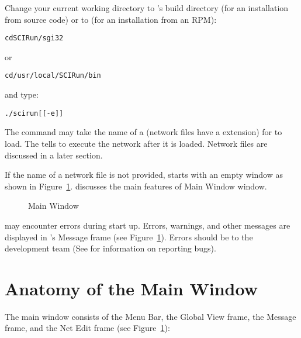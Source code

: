 Change your current working directory to \sr{}'s
build directory (for an installation from source code) or to
 (for an installation from an RPM):

\begin{alltt}
  cd SCIRun/sgi32
\end{alltt}

or

\begin{alltt}
  cd /usr/local/SCIRun/bin
\end{alltt}

and type:

\begin{alltt}
  ./scirun [ [-e]  ]
\end{alltt}


The  command may take the name of a
 (network files have a  extension)
for \sr{} to load.  The  tells \sr{} to execute the network
after it is loaded.  Network files are discussed in a later section.

If the name of a network file is not provided, \sr{} starts with an empty
  window as shown in Figure~\ref{fig:srwindow}.   discusses the main features
of Main Window window.

\begin{figure}[htb]
  \begin{makeimage}
  \end{makeimage}
  \srwindow
  \caption{\label{fig:srwindow} \sr{} Main Window}
\end{figure}

\sr{} may encounter errors during start up.  Errors, warnings, and
other messages are displayed in \sr{}'s Message frame (see
Figure~\ref{fig:srwindow}).  Errors should be
 to the \sr{} development team
(See  for information on reporting
bugs).

\section{Anatomy of the Main Window}
\label{sec:windowanatomy}

The \sr{} main window consists of the Menu Bar, the Global View frame,
the Message frame, and the Net Edit frame (see
Figure~\ref{fig:srwindow}):

